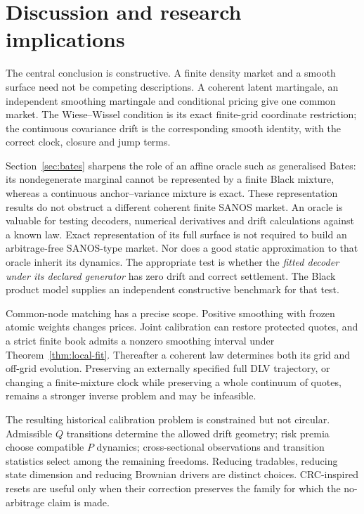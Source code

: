 \documentclass[11pt,a4paper]{article}
\numberwithin{equation}{section}
\theoremstyle{definition}\newtheorem{definition}[theorem]{Definition}
\theoremstyle{remark}\newtheorem{remark}[theorem]{Remark}
\begin{document}
\section{Discussion and research implications}
The central conclusion is constructive. A finite density market and a smooth surface need not be competing descriptions. A coherent latent martingale, an independent smoothing martingale and conditional pricing give one common market. The Wiese--Wissel condition is its exact finite-grid coordinate restriction; the continuous covariance drift is the corresponding smooth identity, with the correct clock, closure and jump terms.

Section~\ref{sec:bates} sharpens the role of an affine oracle such as generalised Bates: its nondegenerate marginal cannot be represented by a finite Black mixture, whereas a continuous anchor--variance mixture is exact. These representation results do not obstruct a different coherent finite SANOS market. An oracle is valuable for testing decoders, numerical derivatives and drift calculations against a known law. Exact representation of its full surface is not required to build an arbitrage-free SANOS-type market. Nor does a good static approximation to that oracle inherit its dynamics. The appropriate test is whether the \emph{fitted decoder under its declared generator} has zero drift and correct settlement. The Black product model supplies an independent constructive benchmark for that test.

Common-node matching has a precise scope. Positive smoothing with frozen atomic weights changes prices. Joint calibration can restore protected quotes, and a strict finite book admits a nonzero smoothing interval under Theorem~\ref{thm:local-fit}. Thereafter a coherent law determines both its grid and off-grid evolution. Preserving an externally specified full DLV trajectory, or changing a finite-mixture clock while preserving a whole continuum of quotes, remains a stronger inverse problem and may be infeasible.

The resulting historical calibration problem is constrained but not circular. Admissible $Q$ transitions determine the allowed drift geometry; risk premia choose compatible $P$ dynamics; cross-sectional observations and transition statistics select among the remaining freedoms. Reducing tradables, reducing state dimension and reducing Brownian drivers are distinct choices. CRC-inspired resets are useful only when their correction preserves the family for which the no-arbitrage claim is made.
\end{document}
